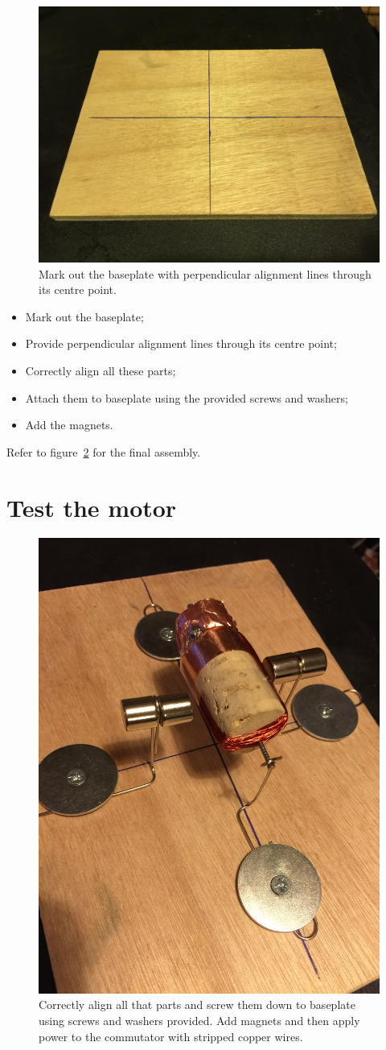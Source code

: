 \documentclass{instructions}
\begin{document}
\begin{figure}
    \centering
    \includegraphics[width=0.8\linewidth]{dc-motor-004}
    \caption{Mark out the baseplate with perpendicular alignment lines
through its centre point.}

    \label{fig5}
\end{figure}

\begin{itemize}
\item Mark out the baseplate;
\item Provide perpendicular alignment lines through its centre point;
\item Correctly align all these parts;
\item Attach them to baseplate using the provided screws and washers;
\item Add the magnets.
\end{itemize}

Refer to figure~\ref{fig6} for the final assembly.


\part{Test the motor}

\begin{figure}
    \centering
    \includegraphics[width=0.5\linewidth]{dc-motor-005}
    \caption{Correctly align all that parts and screw them down to
baseplate using screws and washers provided. Add magnets and then apply
power to the commutator with stripped copper wires.}

    \label{fig6}
\end{figure}
\end{document}
